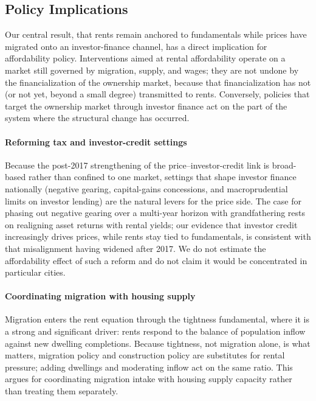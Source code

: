 \documentclass[preprint,11pt,authoryear]{elsarticle}
\begin{document}
\subsection{Policy Implications}
\label{sec:policy_implications}

Our central result, that rents remain anchored to fundamentals while
prices have migrated onto an investor-finance channel, has a direct
implication for affordability policy. Interventions aimed at rental
affordability operate on a market still governed by migration, supply,
and wages; they are not undone by the financialization of the ownership
market, because that financialization has not (or not yet, beyond a
small degree) transmitted to rents. Conversely, policies that target
the ownership market through investor finance act on the part of the
system where the structural change has occurred.

\paragraph{Reforming tax and investor-credit settings}
Because the post-2017 strengthening of the price--investor-credit link
is broad-based rather than confined to one market, settings that shape
investor finance nationally (negative gearing, capital-gains
concessions, and macroprudential limits on investor lending) are the
natural levers for the price side. The case for phasing out negative
gearing over a multi-year horizon with grandfathering rests on
realigning asset returns with rental yields; our evidence that investor
credit increasingly drives prices, while rents stay tied to
fundamentals, is consistent with that misalignment having widened after
2017. We do not estimate the affordability effect of such a reform and
do not claim it would be concentrated in particular cities.

\paragraph{Coordinating migration with housing supply}
Migration enters the rent equation through the tightness fundamental,
where it is a strong and significant driver: rents respond to the
balance of population inflow against new dwelling completions. Because
tightness, not migration alone, is what matters, migration policy and
construction policy are substitutes for rental pressure; adding
dwellings and moderating inflow act on the same ratio. This argues for
coordinating migration intake with housing supply capacity rather than
treating them separately.
\end{document}
